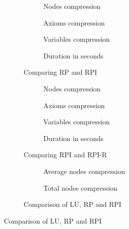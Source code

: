 \begin{figure}[hbt]
  \begin{subfigure}{0.5\textwidth}
    \centering
    \caption{Nodes compression}
  \end{subfigure}
  \begin{subfigure}{0.5\textwidth}
    \centering
    \caption{Axioms compression}
  \end{subfigure}
  \begin{subfigure}{0.5\textwidth}
    \centering
    \caption{Variables compression}
  \end{subfigure}
  \begin{subfigure}{0.5\textwidth}
    \centering
    \caption{Duration in seconds}
  \end{subfigure}
  \caption{Comparing RP and RPI}
\end{figure}
\begin{figure}[hbt]
  \begin{subfigure}{0.5\textwidth}
    \centering
    \caption{Nodes compression}
  \end{subfigure}
  \begin{subfigure}{0.5\textwidth}
    \centering
    \caption{Axioms compression}
  \end{subfigure}
  \begin{subfigure}{0.5\textwidth}
    \centering
    \caption{Variables compression}
  \end{subfigure}
  \begin{subfigure}{0.5\textwidth}
    \centering
    \caption{Duration in seconds}
  \end{subfigure}
  \caption{Comparing RPI and RPI-R}
\end{figure}
\begin{figure}[hbt]
  \begin{subfigure}{0.5\textwidth}
    \centering
    \caption{Average nodes compression}
  \end{subfigure}
  \begin{subfigure}{0.5\textwidth}
    \centering
    \caption{Total nodes compression}
  \end{subfigure}
  \caption{Comparison of LU, RP and RPI}
\end{figure}
\begin{table}[hbt]
  \centering
  \caption{Comparison of LU, RP and RPI}
\end{table}
